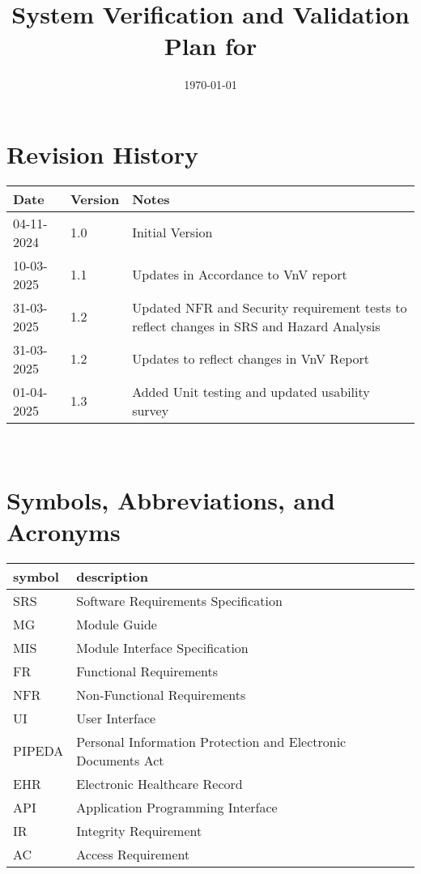 \documentclass[12pt, titlepage]{article}
\begin{document}
\title{System Verification and Validation Plan for \progname{}} 
\author{\authname}
\date{\today}
	
\maketitle


\section*{Revision History}

\begin{tabularx}{\textwidth}{p{3cm}p{2cm}X}
\toprule {\bf Date} & {\bf Version} & {\bf Notes}\\
\midrule
04-11-2024 & 1.0 & Initial Version\\
10-03-2025 & 1.1 & Updates in Accordance to VnV report\\
31-03-2025 & 1.2 & Updated NFR and Security requirement tests to reflect changes in SRS and Hazard Analysis\\
31-03-2025 & 1.2 & Updates to reflect changes in VnV Report\\
01-04-2025 & 1.3 & Added Unit testing and updated usability survey\\
\bottomrule
\end{tabularx}

~\\

\newpage

\tableofcontents

\listoftables


\newpage

\section{Symbols, Abbreviations, and Acronyms} \label{section:1}

\renewcommand{\arraystretch}{1.2}
\begin{tabular}{l l} 
  \toprule		
  \textbf{symbol} & \textbf{description}\\
  \midrule 
  SRS & Software Requirements Specification\\
  MG & Module Guide\\
  MIS & Module Interface Specification\\
  FR & Functional Requirements\\
  NFR & Non-Functional Requirements\\
  UI & User Interface\\
  PIPEDA & Personal Information Protection and Electronic Documents Act\\
  EHR & Electronic Healthcare Record\\
  API & Application Programming Interface \\
  IR & Integrity Requirement \\
  AC & Access Requirement \\
  \bottomrule
\end{tabular}\\
\end{document}
